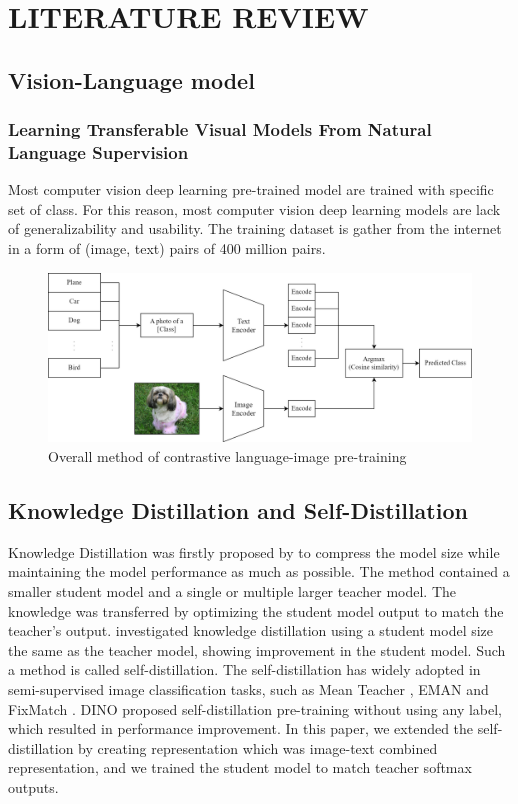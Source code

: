 \chapter{LITERATURE REVIEW}

\section{Vision-Language model}
\subsection{Learning Transferable Visual Models From Natural Language Supervision}
Most computer vision deep learning pre-trained model are trained with specific set of class.
For this reason, most computer vision deep learning models are lack of generalizability and usability.
The training dataset is gather from the internet in a form of (image, text) pairs of 400 million pairs.

\begin{figure}[h]
    \caption{Overall method of contrastive language-image pre-training}
    \label{fig:clip_classification}
    \centering
    \includegraphics[width=1\textwidth]{Images/CLIPClassification.png}
    \small
\end{figure}

\section{Knowledge Distillation and Self-Distillation}
Knowledge Distillation was firstly proposed by  to compress the model size while maintaining the model performance as much as possible.
The method contained a smaller student model and a single or multiple larger teacher model.
The knowledge was transferred by optimizing the student model output to match the teacher's output.
 investigated knowledge distillation using a student model size the same as the teacher model, showing improvement in the student model.
Such a method is called self-distillation.
The self-distillation has widely adopted in semi-supervised image classification tasks, such as Mean Teacher , EMAN  and FixMatch .
DINO  proposed self-distillation pre-training without using any label, which resulted in performance improvement.
In this paper, we extended the self-distillation by creating representation which was image-text combined representation, and we trained the student model to match teacher softmax outputs.

